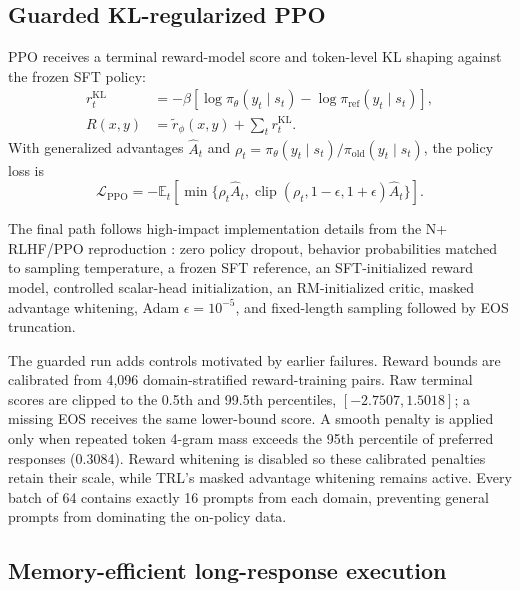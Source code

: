 \documentclass[10pt,twocolumn]{article}
\begin{document}
\subsection{Guarded KL-regularized PPO}

PPO \cite{schulman2017} receives a terminal reward-model score and token-level
KL shaping against the frozen SFT policy:
\begin{align}
r_t^{\mathrm{KL}}
&=-\beta\left[\log\pi_\theta(y_t\mid s_t)
-\log\pi_{\mathrm{ref}}(y_t\mid s_t)\right],\\
R(x,y)&=\widetilde r_\phi(x,y)+\sum_t r_t^{\mathrm{KL}}.
\end{align}
With generalized advantages $\hat A_t$ and
$\rho_t=\pi_\theta(y_t\mid s_t)/\pi_{\mathrm{old}}(y_t\mid s_t)$, the policy
loss is
\begin{equation}
\mathcal{L}_{\mathrm{PPO}}
=-\mathbb{E}_t\!\left[
\min\{\rho_t\hat A_t,
\operatorname{clip}(\rho_t,1-\epsilon,1+\epsilon)\hat A_t\}
\right].
\label{eq:ppo}
\end{equation}

The final path follows high-impact implementation details from the N+ RLHF/PPO
reproduction \cite{huang2024}: zero policy dropout, behavior probabilities
matched to sampling temperature, a frozen SFT reference, an SFT-initialized
reward model, controlled scalar-head initialization, an RM-initialized critic,
masked advantage whitening, Adam $\epsilon=10^{-5}$, and fixed-length sampling
followed by EOS truncation.

The guarded run adds controls motivated by earlier failures. Reward bounds are
calibrated from 4,096 domain-stratified reward-training pairs. Raw terminal
scores are clipped to the 0.5th and 99.5th percentiles,
$[-2.7507,1.5018]$; a missing EOS receives the same lower-bound score. A smooth
penalty is applied only when repeated token 4-gram mass exceeds the 95th
percentile of preferred responses (0.3084). Reward whitening is disabled so
these calibrated penalties retain their scale, while TRL's masked advantage
whitening remains active. Every batch of 64 contains exactly 16 prompts from
each domain, preventing general prompts from dominating the on-policy data.

\subsection{Memory-efficient long-response execution}
\end{document}
